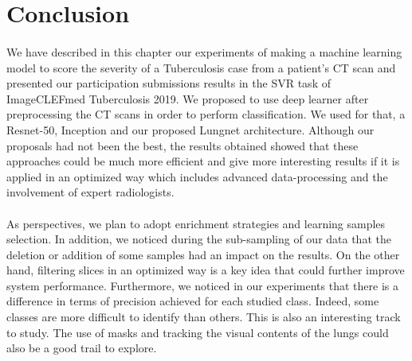 \section{Conclusion}
\paragraph{}
We have described in this chapter our experiments of making a machine learning model to score the severity of a Tuberculosis case from a patient's CT scan and presented our participation submissions results in the SVR task of ImageCLEFmed Tuberculosis 2019. We proposed to use deep learner after preprocessing the CT scans in order to perform classification. We used for that, a Resnet-50, Inception and our proposed Lungnet architecture. Although our proposals had not been the best, the results obtained showed that these approaches could be much more efficient and give more interesting results if it is applied in an optimized way which includes advanced data-processing and the involvement of expert radiologists.
\paragraph{}
As perspectives, we plan to adopt enrichment strategies and learning samples selection. In addition, we noticed during the sub-sampling of our data that the deletion or addition of some samples had an impact on the results. On the other hand, filtering slices in an optimized way is a key idea that could further improve system performance. Furthermore, we noticed in our experiments that there is a difference in terms of precision achieved for each studied class. Indeed, some classes are more difficult to identify than others. This is also an interesting track to study. The use of masks and tracking the visual contents of the lungs could also be a good trail to explore.


